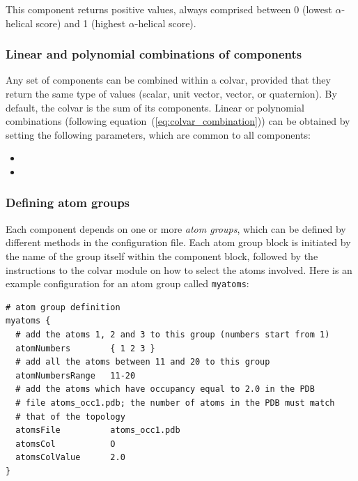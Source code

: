 This component returns positive values, always comprised between 0
(lowest $\alpha$-helical score) and 1 (highest $\alpha$-helical
score).



\subsubsection{Linear and polynomial combinations of components}
Any set of components can be combined within a colvar,
provided that they return
the same type of values (scalar, unit vector, vector, or quaternion).
By default, the colvar is the sum of its components.
Linear or polynomial combinations (following equation~(\ref{eq:colvar_combination}))
can be obtained by setting the following
parameters, which are common to all components:
\begin{itemize}

\item %

\item %

\end{itemize}


\subsubsection{Defining atom groups}
\label{sec:colvar_atom_groups}
Each component depends on one
or more \emph{atom groups}, which can be defined by different methods
in the configuration file.  Each atom group block is
initiated by the name of the group itself within the component block,
followed by the instructions to the colvar module on how to select the
atoms involved.  Here is an example configuration for an atom group called
\texttt{myatoms}:
\begin{verbatim}
# atom group definition
myatoms {
  # add the atoms 1, 2 and 3 to this group (numbers start from 1)
  atomNumbers        { 1 2 3 }
  # add all the atoms between 11 and 20 to this group
  atomNumbersRange   11-20
  # add the atoms which have occupancy equal to 2.0 in the PDB
  # file atoms_occ1.pdb; the number of atoms in the PDB must match
  # that of the topology
  atomsFile          atoms_occ1.pdb
  atomsCol           O
  atomsColValue      2.0
}
\end{verbatim}

